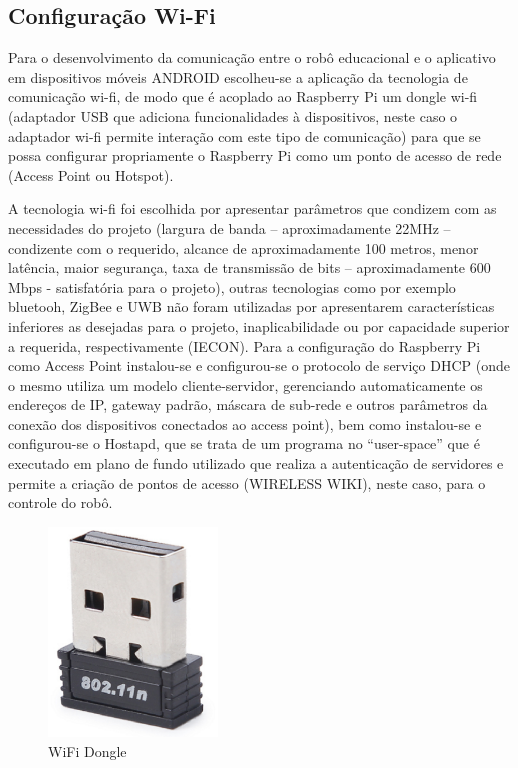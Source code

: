 \subsection{Configuração Wi-Fi}

Para o desenvolvimento da comunicação entre o robô educacional e o aplicativo em dispositivos móveis ANDROID escolheu-se a aplicação da tecnologia de comunicação wi-fi, de modo que é acoplado ao Raspberry Pi um dongle wi-fi (adaptador USB que adiciona funcionalidades à dispositivos, neste caso o adaptador wi-fi permite interação com este tipo de comunicação) para que se possa configurar propriamente o Raspberry Pi como um ponto de acesso de rede (Access Point ou Hotspot).

A tecnologia wi-fi foi escolhida por apresentar parâmetros que condizem com as necessidades do projeto (largura de banda – aproximadamente 22MHz – condizente com o requerido, alcance de aproximadamente 100 metros, menor latência, maior segurança, taxa de transmissão de bits – aproximadamente 600 Mbps - satisfatória para o projeto), outras tecnologias como por exemplo bluetooh, ZigBee e UWB não foram utilizadas por apresentarem características inferiores as desejadas para o projeto, inaplicabilidade ou por capacidade superior a requerida, respectivamente (IECON). Para a configuração do Raspberry Pi como Access Point instalou-se e configurou-se o protocolo de serviço DHCP (onde o mesmo utiliza um modelo cliente-servidor, gerenciando automaticamente os endereços de IP, gateway padrão, máscara de sub-rede e outros parâmetros da conexão dos dispositivos conectados ao access point), bem como instalou-se e configurou-se o Hostapd, que se trata de um programa no “user-space” que é executado em plano de fundo utilizado que realiza a autenticação de servidores e permite a criação de pontos de acesso (WIRELESS WIKI), neste caso, para o controle do robô. 

\begin{figure}[H]
    \centering
    \includegraphics[width=0.4\textwidth]{figuras/adaptador_wifi.eps}
    \caption{ WiFi Dongle}
    \label{fig:catia01}
\end{figure}

